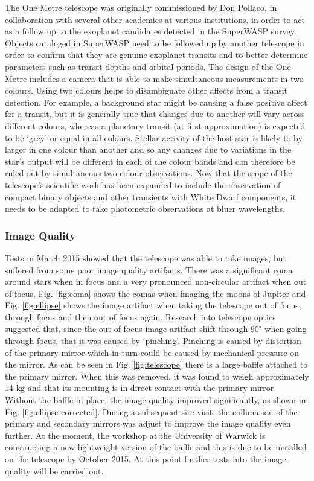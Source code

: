 \documentclass[a4paper,fleqn,usenatbib]{mnras}
\begin{document}
The One Metre telescope was originally commissioned by Don Pollaco, in collaboration with several other academics at various institutions, in order to act as a follow up to the exoplanet candidates detected in the SuperWASP \citep{PollaccoSuperWASP} survey. Objects cataloged in SuperWASP need to be followed up by another telescope in order to confirm that they are genuine exoplanet transits and to better determine parameters such as transit depths and orbital periods. The design of the One Metre includes a camera that is able to make simultaneous measurements in two colours. Using two colours helps to disambiguate other affects from a transit detection. For example, a background star might be causing a false positive affect for a transit, but it is generally true that changes due to another will vary across different colours, whereas a planetary transit (at first approximation) is expected to be `grey' or equal in all colours. Stellar activity of the host star is likely to by larger in one colour than another and so any changes due to variations in the star's output will be different in each of the colour bands and can therefore be ruled out by simultaneous two colour observations. Now that the scope of the telescope's scientific work has been expanded to include the observation of compact binary objects and other transients with White Dwarf components, it needs to be adapted to take photometric observations at bluer wavelengths. 

\subsubsection{Image Quality}
Tests in March 2015 showed that the telescope was able to take images, but suffered from some poor image quality artifacts. There was a significant coma around stars when in focus and a very pronounced non-circular artifact when out of focus. Fig. \ref{fig:coma} shows the comas when imaging the moons of Jupiter and Fig. \ref{fig:ellipse} shows the image artifact when taking the telescope out of focus, through focus and then out of focus again. Research into telescope optics suggested that, since the out-of-focus image artifact shift through $90^\circ$ when going through focus, that it was caused by `pinching'. Pinching is caused by distortion of the primary mirror which in turn could be caused by mechanical pressure on the mirror. As can be seen in Fig. \ref{fig:telescope} there is a large baffle attached to the primary mirror. When this was removed, it was found to weigh approximately 14 kg and that its mounting is in direct contact with the primary mirror. Without the baffle in place, the image quality improved significantly, as shown in Fig. \ref{fig:ellipse-corrected}. During a subsequent site visit, the collimation of the primary and secondary mirrors was adjust to improve the image quality even further. At the moment, the workshop at the University of Warwick is constructing a new lightweight version of the baffle and this is due to be installed on the telescope by October 2015. At this point further tests into the image quality will be carried out.  
\end{document}
